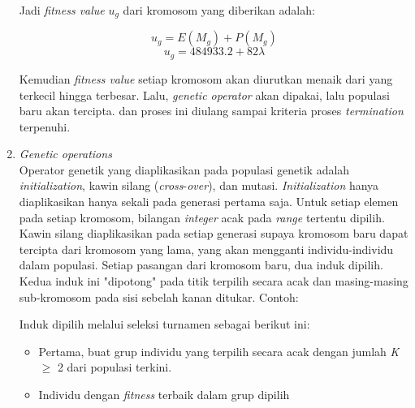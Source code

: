 \begin{enumerate}[1.]
Jadi \textit{fitness value} \begin{math} u_g \end{math} dari kromosom yang diberikan adalah:

\begin{displaymath} u_g = E(M_g)+P(M_g)\end{displaymath}
\begin{displaymath} u_g =  484933.2 + 82\lambda \end{displaymath}

Kemudian \textit{fitness value} setiap kromosom akan diurutkan menaik dari yang terkecil hingga terbesar. Lalu, \textit{genetic operator} akan dipakai, lalu populasi baru akan tercipta. dan proses ini diulang sampai kriteria proses \textit{termination} terpenuhi.

\item \textit{Genetic operations}
\\
Operator genetik yang diaplikasikan pada populasi genetik adalah \textit{initialization}, kawin silang (\textit{cross}-\textit{over}), dan mutasi. \textit{Initialization} hanya diaplikasikan hanya sekali pada generasi pertama saja. Untuk setiap elemen pada setiap kromosom, bilangan \textit{integer} acak pada \textit{range} tertentu dipilih.
\\
Kawin silang diaplikasikan pada setiap generasi supaya kromosom baru dapat tercipta dari kromosom yang lama, yang akan mengganti individu-individu dalam populasi. Setiap pasangan dari kromosom baru, dua induk dipilih. Kedua induk ini "dipotong" pada titik terpilih secara acak
dan masing-masing sub-kromosom pada sisi sebelah kanan ditukar. Contoh:

%

Induk dipilih melalui seleksi turnamen sebagai berikut ini:
\begin{itemize}
	\item Pertama, buat grup individu yang terpilih secara acak dengan jumlah \textit{K} \begin{math} \geq \end{math} 2 dari populasi terkini.
	\item Individu dengan \textit{fitness} terbaik dalam grup dipilih
\end{itemize}


\end{enumerate}
